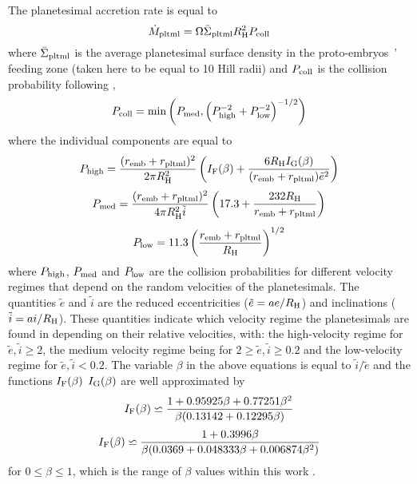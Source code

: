 \documentclass[a4paper,fleqn,usenatbib]{mnras}
\newcommand{\embs}{{{proto-embryos~}}}
\begin{document}
The planetesimal accretion rate is equal to
\begin{equation}
\label{eq:mdotpltml}
    \dot{M}_{\rm pltml} = \Omega \bar{\Sigma}_{\rm pltml} R_{\rm H}^2 P_{\rm coll}
\end{equation}
where $\bar{\Sigma}_{\rm pltml}$ is the average planetesimal surface density in the \embs' feeding zone (taken here to be equal to 10 Hill radii) and $P_{\rm coll}$ is the collision probability following \citet{Inaba01},
\begin{equation}
\label{eq:P_col}
P_{\rm coll}=\min\left( {P}_{\rm med},\left({P}^{-2}_{\rm high}+{P}^{-2}_{\rm low}\right)^{-1/2}\right)
\end{equation}
where the individual components are equal to
\begin{equation}
    P_{\rm high} = \frac{(r_{\rm emb}+r_{\rm pltml})^2}{2\pi R_{\rm H}^2}\left(I_{\rm F}(\beta)+\frac{6R_{\rm H}I_{\rm G}(\beta)}{(r_{\rm emb}+r_{\rm pltml})\tilde{e}^2} \right)
\end{equation}
\begin{equation}
    P_{\rm med} = \frac{(r_{\rm emb}+r_{\rm pltml})^2}{4\pi R_{\rm H}^2\tilde{i}}\left(17.3+\frac{232R_{\rm H}}{r_{\rm emb}+r_{\rm pltml}}\right)
\end{equation}
\begin{equation}
    P_{\rm low} = 11.3\left(\frac{r_{\rm emb}+r_{\rm pltml}}{R_{\rm H}}\right)^{1/2}
\end{equation}
where $P_{\rm high}$, $P_{\rm med}$ and $P_{\rm low}$ are the collision probabilities for different velocity regimes that depend on the random velocities of the planetesimals.
The quantities $\tilde{e}$ and $\tilde{i}$ are the reduced eccentricities ($\tilde{e}=ae/R_{\rm H}$) and inclinations ($\tilde{i}=ai/R_{\rm H}$).
These quantities indicate which velocity regime the planetesimals are found in depending on their relative velocities, with: the high-velocity regime for $\tilde{e},\tilde{i} \ge 2$, the medium velocity regime being for $2\ge\tilde{e},\tilde{i} \ge 0.2$ and the low-velocity regime for $\tilde{e},\tilde{i} < 0.2$.
The variable $\beta$ in the above equations is equal to $\tilde{i}/\tilde{e}$ and the functions $I_{\rm F}(\beta)$  $I_{\rm G}(\beta)$ are well approximated by
\begin{equation}
    I_{\rm F}(\beta) \backsimeq \frac{1+0.95925\beta+0.77251\beta^2}{\beta(0.13142+0.12295\beta)}
\end{equation}
\begin{equation}
    I_{\rm F}(\beta) \backsimeq \frac{1+0.3996\beta}{\beta(0.0369+0.048333\beta+0.006874\beta^2)}
\end{equation}
for $0\le\beta\le 1$, which is the range of $\beta$ values within this work \citep{Chambers06}.
\end{document}
